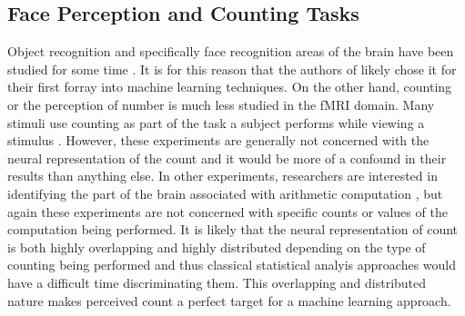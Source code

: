 \documentclass[12pt]{article}
\begin{document}
\subsection{Face Perception and Counting Tasks}
Object recognition and specifically face recognition areas of the brain have been studied for some time \cite{McCarthy1997}. 
It is for this reason that the authors of \cite{Haxby2001} likely chose it for their first forray into machine learning techniques. 
On the other hand, counting or the perception of number is much less studied in the fMRI domain.
Many stimuli use counting as part of the task a subject performs while viewing a stimulus \cite{Bush1998,Mostofsky2003}.
However, these experiments are generally not concerned with the neural representation of the count and it would be more of a confound in their results than anything else.
In other experiments, researchers are interested in identifying the part of the brain associated with arithmetic computation \cite{Rickard2000,Eliez2001}, but again these experiments are not concerned with specific counts or values of the computation being performed.
It is likely that the neural representation of count is both highly overlapping and highly distributed depending on the type of counting being performed and thus classical statistical analyis approaches would have a difficult time discriminating them. 
This overlapping and distributed nature makes perceived count a perfect target for a machine learning approach.
\end{document}
